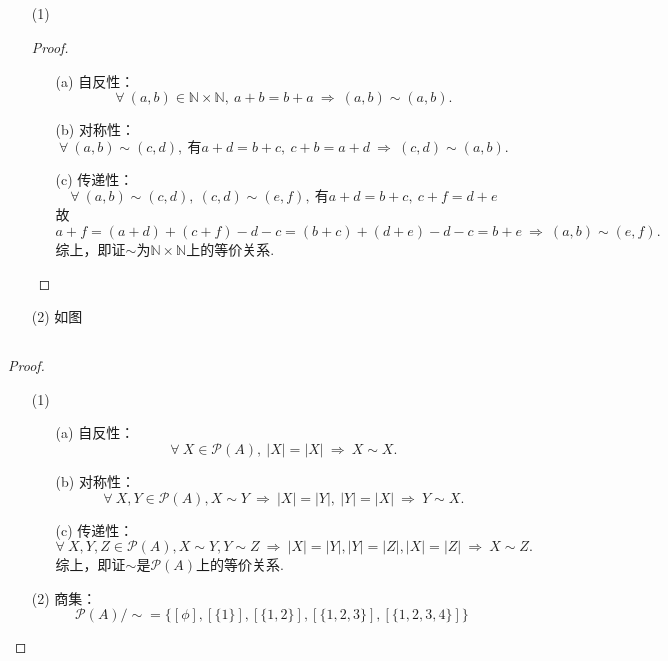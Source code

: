 \documentclass[UTF8]{ctexart}
\begin{document}
\subsection{}   %
\begin{enumerate}
    \item [(1)]
    \begin{proof}
        \begin{enumerate}
            \item [(a)]自反性：
            \[
                \forall\ (a,b)\in \mathbb{N}\times \mathbb{N},\ 
                a+b = b+a\ \Rightarrow\ (a,b)\sim (a,b).    
            \]
            \item [(b)]对称性：
            \[
                \forall\ (a,b)\sim (c,d),\ \mbox{有}
                a+d = b+c,\ c+b = a+d
                \ \Rightarrow\ 
                (c,d)\sim (a,b).    
            \]
            \item [(c)]传递性：
            \[
                \forall\ (a,b)\sim (c,d),\ (c,d)\sim (e,f),\ \mbox{有}
                a+d = b+c,\ c+f = d+e
            \]
            故
            \[
                a+f = (a+d)+(c+f)-d-c = (b+c)+(d+e)-d-c = b+e
                \ \Rightarrow\ 
                (a,b)\sim (e,f).
            \]
            综上，即证$\sim$为$\mathbb{N}\times \mathbb{N}$上的等价关系.
        \end{enumerate}
    \end{proof}
    \item [(2)]如图
\end{enumerate}

\subsection{}   %
\begin{proof}
    \begin{enumerate}
        \item []
        \item [(1)]
        \begin{enumerate}
            \item [(a)]自反性：
            \[
                \forall\ X\in \mathscr{P}(A),\ |X|=|X|
                \ \Rightarrow\ 
                X \sim X.
            \]
            \item [(b)]对称性：
            \[
                \forall\ X,Y\in \mathscr{P}(A), X\sim Y
                \ \Rightarrow\ 
                |X|=|Y|,\ |Y|=|X|
                \ \Rightarrow\ 
                Y\sim X.    
            \]
            \item [(c)]传递性：
            \[
                \forall\ X,Y,Z\in \mathscr{P}(A), X\sim Y, Y\sim Z
                \ \Rightarrow\ 
                |X|=|Y|, |Y|=|Z|, |X|=|Z|
                \ \Rightarrow\ 
                X\sim Z.    
            \]
            综上，即证$\sim$是$\mathscr{P}(A)$上的等价关系.
        \end{enumerate}
        \item [(2)]商集：
        \[
            \mathscr{P}(A)/\sim = 
            \{[\phi ],[\{1\}],[\{1,2\}],[\{1,2,3\}],[\{1,2,3,4\}] \}    
        \]
    \end{enumerate}
\end{proof}
\end{document}
